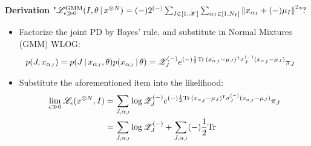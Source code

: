 \begin{frame}[t] 
      {\bf Derivation}
  $ \textnormal{"} 
        \mathscr {L} _{\epsilon \gg 0} 
              ^{\textnormal{GMM}}
        ( I, \theta \,\vert\, x ^{\otimes N} )
       = 
        (-) 2 ^{(-)} 
        \sum _{I \in [1, \mathscr{K}]}
        \sum _{\alpha _{I} \in [1, N _{I}]} 
        \norm  
         { x _{\alpha _{I}}
           + (-) \mu _{I}
         } 
         ^{2}
    \textnormal{"?}
  $ 
  \begin{itemize}
      \item Factorize the joint PD 
         by Bayes' rule, and substitute 
         in Normal Mixtures (GMM) WLOG: 
          { \footnotesize 
          \begin{align*}
              p (J, x _{\alpha _{J}})
             & = 
              p ( J \,\vert\, x _{\alpha _{J}}, \theta )
              p ( x _{\alpha _{J}} \,\vert\, \theta )
             = \mathscr {Z} _{J} ^{(-)} 
               e ^{ (-) \frac {1} {2} 
                    \textnormal{Tr\,} 
                     { ( x _{\alpha _{J}}
                        - \mu _{J}
                       ) ^{\intercal}
                       \sigma _{J} ^{(-)}
                       ( x _{\alpha _{J}}
                        - \mu _{J}
                       ) 
                     }
                  }
              \pi _{J}
          \end{align*}
          }
      \item 
          Substitute the aforementioned item 
          into the likelihood:
          { \footnotesize
          \begin{align*}
              \lim _{\epsilon \gg 0}
                \like {\epsilon} 
                 (x ^{\otimes N}, I) 
            & = 
              \sum _{J, \alpha _{J}}  
              \varlog   
                \mathscr {Z} _{J} ^{(-)} 
               e ^{ (-) \frac {1} {2} 
                    \vartr 
                     { ( x _{\alpha _{J}}
                        - \mu _{J}
                       ) ^{\intercal}
                       \sigma _{J} ^{(-)}
                       ( x _{\alpha _{J}}
                        - \mu _{J}
                       ) 
                     }
                  }
              \pi _{J}
            \\ & = 
              \sum _{J, \alpha _{J}}
              \varlog   
                \mathscr {Z} _{J} ^{(-)}  
            + 
              \sum _{J, \alpha _{J}}
              (-) \frac {1} {2} 
                    \vartr 

\end{align*}}
\end{itemize}
\end{frame}
